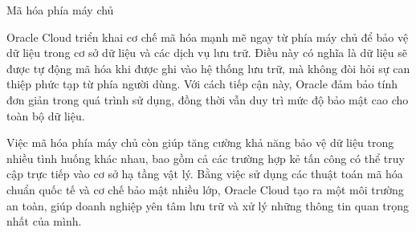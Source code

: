 \begin{myitem}
\item Mã hóa phía máy chủ
\begin{mysubitem}
    \item Oracle Cloud triển khai cơ chế mã hóa mạnh mẽ ngay từ phía máy chủ để bảo vệ dữ liệu trong cơ sở dữ liệu và các dịch vụ lưu trữ. Điều này có nghĩa là dữ liệu sẽ được tự động mã hóa khi được ghi vào hệ thống lưu trữ, mà không đòi hỏi sự can thiệp phức tạp từ phía người dùng. Với cách tiếp cận này, Oracle đảm bảo tính đơn giản trong quá trình sử dụng, đồng thời vẫn duy trì mức độ bảo mật cao cho toàn bộ dữ liệu.

    \item Việc mã hóa phía máy chủ còn giúp tăng cường khả năng bảo vệ dữ liệu trong nhiều tình huống khác nhau, bao gồm cả các trường hợp kẻ tấn công có thể truy cập trực tiếp vào cơ sở hạ tầng vật lý. Bằng việc sử dụng các thuật toán mã hóa chuẩn quốc tế và cơ chế bảo mật nhiều lớp, Oracle Cloud tạo ra một môi trường an toàn, giúp doanh nghiệp yên tâm lưu trữ và xử lý những thông tin quan trọng nhất của mình.

\end{mysubitem}

\end{myitem}

